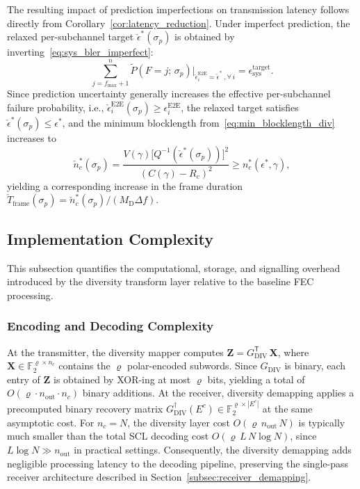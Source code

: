 \documentclass[journal]{IEEEtran}
\begin{document}
The resulting impact of prediction imperfections on transmission latency
follows directly from
Corollary~\ref{cor:latency_reduction}.
Under imperfect prediction, the relaxed per-subchannel
target $\check{\epsilon}^{*}(\sigma_p)$ is obtained by
inverting~\eqref{eq:sys_bler_imperfect}:
\begin{equation}
\sum_{j=f_{\max}+1}^{n}
\tilde{P}(F=j;\,\sigma_p)\big|_{\check{\epsilon}_i^{\mathrm{E2E}}
= \tilde{\epsilon}^{*}\;,\forall\, i}
= \epsilon_{\mathrm{sys}}^{\mathrm{target}}.
\label{eq:eps_star_imperfect}
\end{equation}
Since prediction uncertainty generally increases the effective per-subchannel failure probability, i.e.,
$\check{\epsilon}_i^{\mathrm{E2E}}(\sigma_p) \geq
\epsilon_i^{\mathrm{E2E}}$, the relaxed target satisfies
$\check{\epsilon}^{*}(\sigma_p) \leq \epsilon^{*}$,
and the minimum blocklength
from~\eqref{eq:min_blocklength_div} increases to
\begin{equation}
\check{n}_c^{*}(\sigma_p)
= \frac{V(\gamma)\bigl[Q^{-1}
(\check{\epsilon}^{*}(\sigma_p))\bigr]^2}
{(C(\gamma) - R_c)^2}
\geq n_c^{*}(\epsilon^{*}, \gamma),
\label{eq:min_blocklength_imperfect}
\end{equation}
yielding a corresponding increase in the frame duration
$\check{T}_{\mathrm{frame}}(\sigma_p) =
\check{n}_c^{*}(\sigma_p)/(M_{\mathrm{D}}\Delta f)$.


\subsection{Implementation Complexity}
\label{sec:complexity}

This subsection quantifies the computational, storage, and
signalling overhead introduced by the diversity transform layer
relative to the baseline FEC processing.

\subsubsection{Encoding and Decoding Complexity}
At the transmitter, the diversity mapper computes
$\mathbf{Z} = G_{\mathrm{DIV}}^{\mathsf{T}}\,\mathbf{X}$, where
$\mathbf{X} \in \mathbb{F}_2^{\varrho \times n_c}$ contains the
$\varrho$ polar-encoded subwords. Since $G_{\mathrm{DIV}}$ is binary,
each entry of $\mathbf{Z}$ is obtained by XOR-ing at most $\varrho$
bits, yielding a total of
$O(\varrho \cdot n_{\mathrm{out}} \cdot n_c)$ binary additions.
At the receiver, diversity demapping applies a precomputed binary
recovery matrix
$G_{\mathrm{DIV}}^{\dagger}(E^c) \in
\mathbb{F}_2^{\varrho \times |E^c|}$
at the same asymptotic cost. For $n_c = N$, the diversity layer cost
$O(\varrho\, n_{\mathrm{out}}\, N)$ is typically much smaller than
the total SCL decoding cost $O(\varrho\, L\, N \log N)$, since
$L \log N \gg n_{\mathrm{out}}$ in practical settings. Consequently, the diversity demapping adds negligible
processing latency to the decoding pipeline, preserving the
single-pass receiver architecture described in
Section~\ref{subsec:receiver_demapping}.
\end{document}
